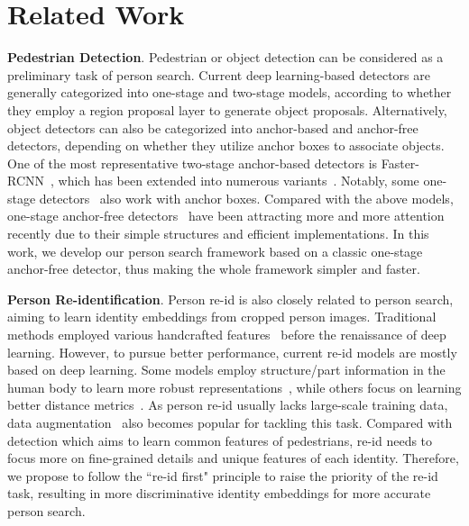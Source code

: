 \documentclass[final]{cvpr}
\begin{document}
\section{Related Work}
\textbf{Pedestrian Detection}. Pedestrian or object detection can be considered as a preliminary task of person search. Current deep learning-based detectors are generally categorized into one-stage and two-stage models, according to whether they employ a region proposal layer to generate object proposals. Alternatively, object detectors can also be categorized into anchor-based and anchor-free detectors, depending on whether they utilize anchor boxes to associate objects. One of the most representative two-stage anchor-based detectors is Faster-RCNN~\cite{DBLP:journals/pami/RenHG017}, which has been extended into numerous variants~\cite{DBLP:conf/iccv/DaiQXLZHW17,DBLP:conf/cvpr/CaiV18,DBLP:conf/cvpr/PangCSFOL19,DBLP:conf/cvpr/SongLW20}. Notably, some one-stage detectors~\cite{DBLP:conf/eccv/LiuAESRFB16,DBLP:conf/iccv/LinGGHD17,DBLP:conf/cvpr/RedmonF17,DBLP:conf/cvpr/ZhangWBLL18} also work with anchor boxes. Compared with the above models, one-stage anchor-free detectors~\cite{DBLP:conf/cvpr/RedmonDGF16,DBLP:conf/eccv/LawD18,DBLP:conf/cvpr/LiuLRHY19,DBLP:journals/corr/abs-1904-07850,DBLP:conf/iccv/YangLHWL19,DBLP:conf/iccv/TianSCH19} have been attracting more and more attention recently due to their simple structures and 
efficient implementations. In this work, we develop our person search framework based on a classic one-stage anchor-free detector, thus making the whole framework simpler and faster.    

\textbf{Person Re-identification}. Person re-id is also closely related to person search, aiming to learn identity embeddings from cropped person images. Traditional methods employed various handcrafted features~\cite{DBLP:journals/ijcv/Lowe04,DBLP:conf/cvpr/FarenzenaBPMC10,DBLP:conf/eccv/GrayT08} before the renaissance of deep learning. However, to pursue better performance, current re-id models are mostly based on deep learning. Some models employ structure/part information in the human body to learn more robust representations~\cite{DBLP:conf/iccv/SuLZX0T17,DBLP:conf/eccv/SunZYTW18,DBLP:conf/iccv/MiaoWLD019,9233968}, while others focus on learning better distance metrics~\cite{DBLP:conf/cvpr/AhmedJM15,DBLP:journals/corr/HermansBL17,DBLP:conf/cvpr/ChenCZH17,DBLP:journals/pami/ChenZZL18,DBLP:journals/pami/WangGZW16}. As person re-id usually lacks large-scale training data, data augmentation~\cite{DBLP:conf/nips/GeLZYYWL18,DBLP:conf/cvpr/LiuNYZCH18,DBLP:conf/cvpr/WeiZ0018,DBLP:conf/iccv/ZhengZY17} also becomes popular for tackling this task. Compared with detection which aims to learn common features of pedestrians, re-id needs to focus more on fine-grained details and unique features of each identity. Therefore, we propose to follow the ``re-id first" principle to raise the priority of the re-id task, resulting in more discriminative identity embeddings for more accurate person search.
\end{document}
